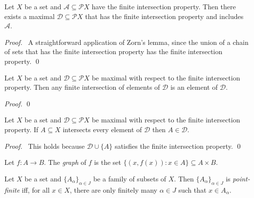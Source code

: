 \begin{lm}[AC]
  \label{lm:sets:finite_intersection_property:maximal}
  Let $X$ be a set and $\mathcal{A} \subseteq \mathcal{P} X$ have the finite intersection property. Then there exists
  a maximal $\mathcal{D} \subseteq \mathcal{P} X$ that has the finite intersection property and includes $\mathcal{A}$.
\end{lm}

\begin{proof}
  \pf\ A straightforward application of Zorn's lemma, since the union of a chain of sets that has the finite intersection property has the finite intersection property. \qed
\end{proof}

\begin{lm}
  \label{lm:sets:finite_intersection_property:finite_intersection}
  Let $X$ be a set and $\mathcal{D} \subseteq \mathcal{P} X$ be maximal with respect to the finite intersection property. Then any finite intersection of elements of $\mathcal{D}$ is an element of $\mathcal{D}$.
\end{lm}

\begin{proof}
  \pf
  \qed
\end{proof}

\begin{lm}
  \label{lm:sets:finite_intersection_property:intersect_all}
  Let $X$ be a set and $\mathcal{D} \subseteq \mathcal{P} X$ be maximal with respect to the finite intersection property. If $A \subseteq X$ intersects every element of $\mathcal{D}$ then $A \in \mathcal{D}$.
\end{lm}

\begin{proof}
  \pf\ This holds because $\mathcal{D} \cup \{ A \}$ satisfies the finite intersection property. \qed
\end{proof}

\begin{df}[Graph]
  Let $f : A \rightarrow B$. The \emph{graph} of $f$ is the set $\{ (x, f(x))
  : x \in A \} \subseteq A \times B$.
\end{df}

 \begin{df}
 Let $X$ be a set and $\{ A_\alpha \}_{\alpha \in J}$ be a family of subsets
 of $X$. Then $\{ A_\alpha \}_{\alpha \in J}$ is \emph{point-finite} iff, for
all $x \in X$, there are only finitely many $\alpha \in J$ such that $x \in
A_\alpha$.
\end{df}

